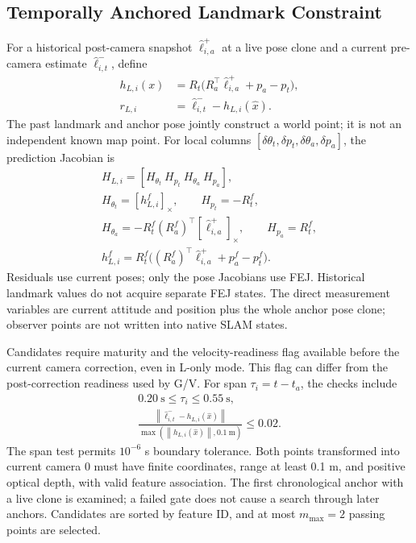 \documentclass[a4paper,runningheads,twocolumn]{llncs}
\newcommand{\sk}[1]{[#1]_{\times}}
\newcommand{\norm}[1]{\left\lVert #1\right\rVert}
\begin{document}
\subsection{Temporally Anchored Landmark Constraint}
For a historical post-camera snapshot $\hat\ell_{i,a}^+$ at a live pose clone and a current pre-camera estimate $\hat\ell_{i,t}^-$, define
\begin{equation}
 \begin{aligned}
 h_{L,i}(x)&=R_t\big(R_a^\top\hat\ell_{i,a}^++p_a-p_t\big),\\
 r_{L,i}&=\hat\ell_{i,t}^--h_{L,i}(\hat x).
 \end{aligned}
 \label{eq:landmark}
\end{equation}
The past landmark and anchor pose jointly construct a world point; it is not an independent known map point. For local columns $[\delta\theta_t,\delta p_t,\delta\theta_a,\delta p_a]$, the prediction Jacobian is
\begin{equation}
 \begin{gathered}
 H_{L,i}=[H_{\theta_t}\ H_{p_t}\ H_{\theta_a}\ H_{p_a}],\\
 H_{\theta_t}=\sk{h_{L,i}^f},\qquad H_{p_t}=-R_t^f,\\
 H_{\theta_a}=-R_t^f(R_a^f)^\top\sk{\hat\ell_{i,a}^+},\qquad
 H_{p_a}=R_t^f,\\
 h_{L,i}^f=R_t^f\big((R_a^f)^\top\hat\ell_{i,a}^++p_a^f-p_t^f\big).
 \end{gathered}
 \label{eq:landmarkH}
\end{equation}
Residuals use current poses; only the pose Jacobians use FEJ. Historical landmark values do not acquire separate FEJ states. The direct measurement variables are current attitude and position plus the whole anchor pose clone; observer points are not written into native SLAM states.

Candidates require maturity and the velocity-readiness flag available before the current camera correction, even in L-only mode. This flag can differ from the post-correction readiness used by G/V. For span $\tau_i=t-t_a$, the checks include
\begin{equation}
 \begin{gathered}
 0.20~\mathrm{s}\leq\tau_i\leq0.55~\mathrm{s},\\
 \frac{\norm{\hat\ell_{i,t}^--h_{L,i}(\hat x)}}
 {\max(\norm{h_{L,i}(\hat x)},0.1~\mathrm{m})}\leq0.02.
 \end{gathered}
 \label{eq:lvalid}
\end{equation}
The span test permits $10^{-6}$ s boundary tolerance. Both points transformed into current camera 0 must have finite coordinates, range at least 0.1 m, and positive optical depth, with valid feature association. The first chronological anchor with a live clone is examined; a failed gate does not cause a search through later anchors. Candidates are sorted by feature ID, and at most $m_{\max}=2$ passing points are selected.
\end{document}
